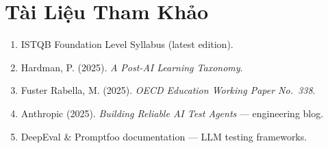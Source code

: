 \documentclass[12pt, a4paper]{report}
\begin{document}
\chapter*{Tài Liệu Tham Khảo}

\begin{enumerate}
    \item ISTQB Foundation Level Syllabus (latest edition).
    \item Hardman, P. (2025). \textit{A Post-AI Learning Taxonomy}.
    \item Fuster Rabella, M. (2025). \textit{OECD Education Working Paper No.~338}.
    \item Anthropic (2025). \textit{Building Reliable AI Test Agents} — engineering blog.
    \item DeepEval \& Promptfoo documentation — LLM testing frameworks.
\end{enumerate}
\end{document}
